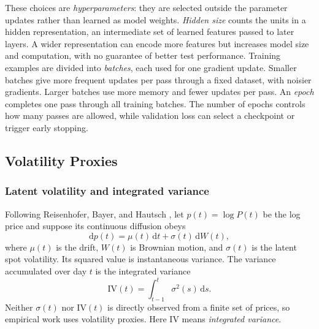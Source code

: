 \documentclass[12pt,a4paper]{article}
\numberwithin{equation}{section}
\numberwithin{table}{section}
\numberwithin{figure}{section}
\begin{document}
These choices are \emph{hyperparameters}: they are selected outside the parameter updates rather than learned as model weights. \emph{Hidden size} counts the units in a hidden representation, an intermediate set of learned features passed to later layers. A wider representation can encode more features but increases model size and computation, with no guarantee of better test performance. Training examples are divided into \emph{batches}, each used for one gradient update. Smaller batches give more frequent updates per pass through a fixed dataset, with noisier gradients. Larger batches use more memory and fewer updates per pass. An \emph{epoch} completes one pass through all training batches. The number of epochs controls how many passes are allowed, while validation loss can select a checkpoint or trigger early stopping.

\subsection{Volatility Proxies}
\subsubsection{Latent volatility and integrated variance}
Following Reisenhofer, Bayer, and Hautsch \cite{reisenhofer2022}, let $p(t)=\log P(t)$ be the log price and suppose its continuous diffusion obeys
\begin{equation}\label{eq:log-price-diffusion}
\mathrm dp(t)=\mu(t)\,\mathrm dt+\sigma(t)\,\mathrm dW(t),
\end{equation}
where $\mu(t)$ is the drift, $W(t)$ is Brownian motion, and $\sigma(t)$ is the latent spot volatility. Its squared value is instantaneous variance. The variance accumulated over day $t$ is the integrated variance
\begin{equation}\label{eq:integrated-variance}
\mathrm{IV}(t)=\int_{t-1}^{t}\sigma^2(s)\,\mathrm ds.
\end{equation}
Neither $\sigma(t)$ nor $\mathrm{IV}(t)$ is directly observed from a finite set of prices, so empirical work uses volatility proxies. Here $\mathrm{IV}$ means \emph{integrated variance}.
\end{document}
